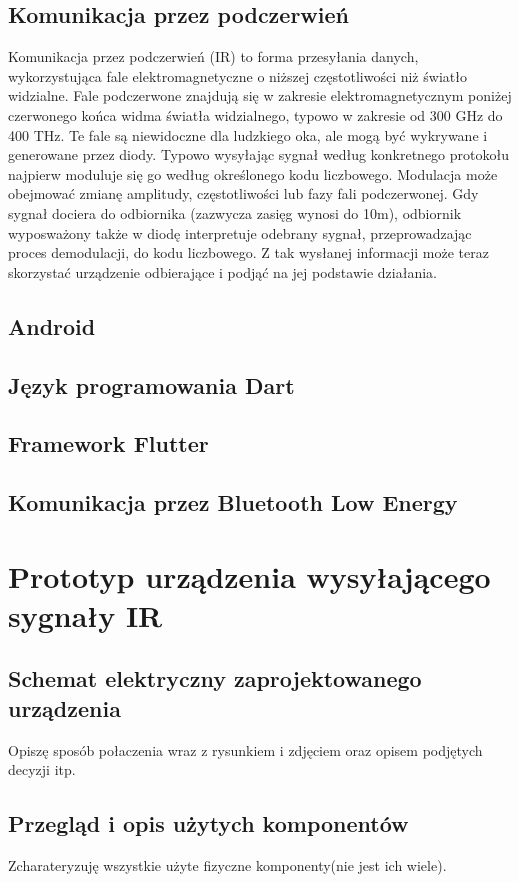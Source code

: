 \documentclass[12pt,twoside]{article}
\begin{document}
\subsection{Komunikacja przez podczerwień}
{Komunikacja przez podczerwień (IR) to forma przesyłania danych, wykorzystująca fale elektromagnetyczne
 o niższej częstotliwości niż światło widzialne. Fale podczerwone znajdują się w zakresie elektromagnetycznym 
 poniżej czerwonego końca widma światła widzialnego, typowo w zakresie od 300 GHz do 400 THz. Te fale są 
 niewidoczne dla ludzkiego oka, ale mogą być wykrywane i generowane przez diody. Typowo 
 wysyłając sygnał według konkretnego protokołu najpierw moduluje się go według określonego kodu liczbowego.
Modulacja może obejmować zmianę amplitudy, częstotliwości lub fazy fali podczerwonej. Gdy sygnał dociera do odbiornika 
(zazwycza zasięg wynosi do 10m), odbiornik wyposważony także w diodę interpretuje odebrany sygnał, przeprowadzając proces demodulacji, do kodu 
liczbowego. Z tak wysłanej informacji może teraz skorzystać urządzenie odbierające i podjąć na jej podstawie działania.
}
\subsection{Android}
\subsection{Język programowania Dart}
\subsection{Framework Flutter}
\subsection{Komunikacja przez Bluetooth Low Energy}

\clearpage	

\section{Prototyp urządzenia wysyłającego sygnały IR}
\subsection{Schemat elektryczny zaprojektowanego urządzenia}
Opiszę sposób połaczenia wraz z rysunkiem i zdjęciem oraz opisem podjętych decyzji itp.
\subsection{Przegląd i opis użytych komponentów}
Zcharateryzuję wszystkie użyte fizyczne komponenty(nie jest ich wiele).
\clearpage
\end{document}

